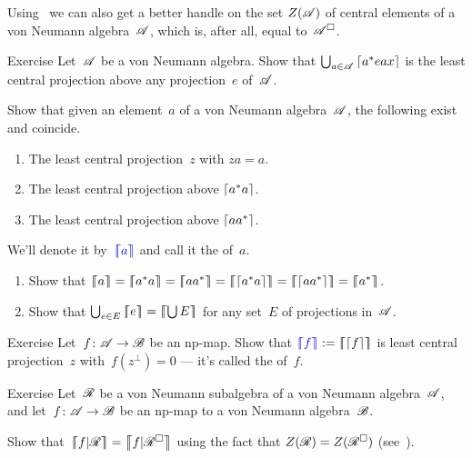 \documentclass[a]{subfiles}
\begin{document}
\begin{parsec}%
\begin{point}%
Using~
we can also get a better handle on the set 
$Z(\mathscr{A})$ of central elements
of a von Neumann algebra~$\mathscr{A}$,
which is, after all, equal to~$\mathscr{A}^\square$.
\end{point}
\begin{point}{Exercise}%
Let~$\mathscr{A}$ be a von Neumann algebra.
Show that
$\bigcup_{a\in\mathscr{A}}\left\lceil a^*eax\right\rceil$
is the least central projection above any projection~$e$
of~$\mathscr{A}$.
\begin{point}%
Show that given an element~$a$ of a von Neumann algebra~$\mathscr{A}$,
the following exist and coincide.
\begin{enumerate}
\item
The least central projection~$z$ with $za=a$.
\item
The least central projection above $\left\lceil a^*a\right\rceil$.
\item
The least central projection above $\left\lceil aa^*\right\rceil$.
\end{enumerate}
We'll denote it by~$\Define{\cceil{a}}$
and call it the  of~$a$.
\end{point}
\begin{point}
\begin{enumerate}
\item
Show that
$\cceil{a}=\cceil{a^*a}=\cceil{aa^*}
= \cceil{\ceil{a^*a}}=\cceil{\ceil{aa^*}}=\cceil{a^*}$.
\item
Show that $\bigcup_{e\in E} \cceil{e}
= \cceil{\bigcup E}$
for any set~$E$ of projections in~$\mathscr{A}$.
\end{enumerate}
\end{point}
\end{point}
\begin{point}{Exercise}%
Let~$f\colon \mathscr{A} \to \mathscr{B}$ be an np-map.
Show that $\Define{\cceil{f}}:=\cceil{\ceil{f}}$ is least central projection~$z$
with~$f(z^\perp)=0$
--- it's called the 
 of~$f$.
\end{point}
\begin{point}{Exercise}%
Let~$\mathscr{R}$ be a von Neumann subalgebra of a von Neumann algebra~$\mathscr{A}$,
and let~$f\colon \mathscr{A}\to\mathscr{B}$ be an np-map
to a von Neumann algebra~$\mathscr{B}$.

Show that~$\cceil{f|\scrR}=\cceil{f|\scrR^\square}$
using the fact that $Z(\mathscr{R})=Z(\mathscr{R}^\square)$
(see~).
\end{point}
\end{parsec}%
\end{document}
